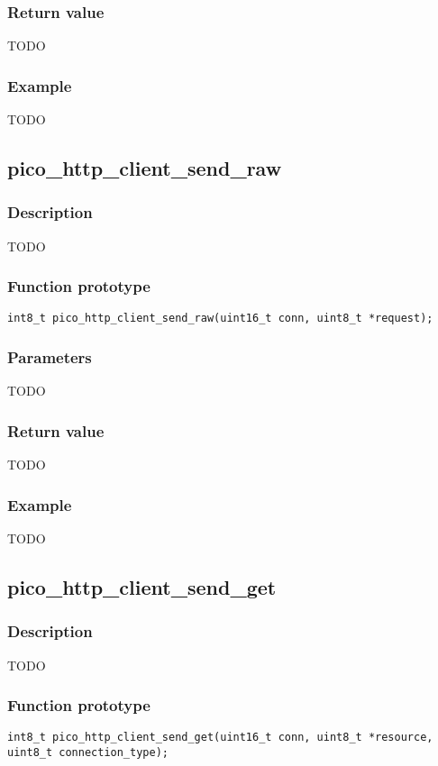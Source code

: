\subsubsection*{Return value}
TODO
\subsubsection*{Example}
TODO


\subsection{pico\_http\_client\_send\_raw}

\subsubsection*{Description}
TODO

\subsubsection*{Function prototype}
\texttt{int8\_t pico\_http\_client\_send\_raw(uint16\_t conn, uint8\_t *request);}

\subsubsection*{Parameters}
TODO
\subsubsection*{Return value}
TODO
\subsubsection*{Example}
TODO


\subsection{pico\_http\_client\_send\_get}

\subsubsection*{Description}
TODO

\subsubsection*{Function prototype}
\texttt{int8\_t pico\_http\_client\_send\_get(uint16\_t conn, uint8\_t *resource, uint8\_t connection\_type);}

